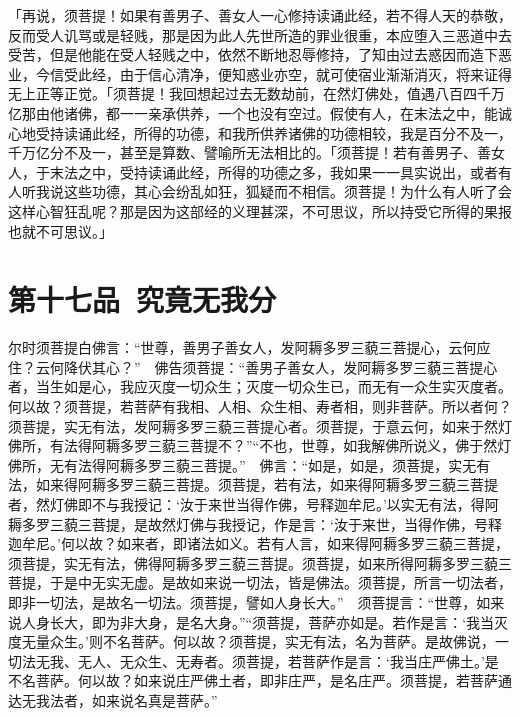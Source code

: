 \documentclass[12pt,twoside,openany]{book}
\newcommand{\kai}[1]{{\CJKfamily{kai}#1}}
\begin{document}
\kai{「再说，须菩提！如果有善男子、善女人一心修持读诵此经，若不得人天的恭敬，反而受人讥骂或是轻贱，那是因为此人先世所造的罪业很重，本应堕入三恶道中去受苦，但是他能在受人轻贱之中，依然不断地忍辱修持，了知由过去惑因而造下恶业，今信受此经，由于信心清净，便知惑业亦空，就可使宿业渐渐消灭，将来证得无上正等正觉。「须菩提！我回想起过去无数劫前，在然灯佛处，值遇八百四千万亿那由他诸佛，都一一亲承供养，一个也没有空过。假使有人，在末法之中，能诚心地受持读诵此经，所得的功德，和我所供养诸佛的功德相较，我是百分不及一，千万亿分不及一，甚至是算数、譬喻所无法相比的。「须菩提！若有善男子、善女人，于末法之中，受持读诵此经，所得的功德之多，我如果一一具实说出，或者有人听我说这些功德，其心会纷乱如狂，狐疑而不相信。须菩提！为什么有人听了会这样心智狂乱呢？那是因为这部经的义理甚深，不可思议，所以持受它所得的果报也就不可思议。」}


\chapter{第十七品\ 究竟无我分}
尔时须菩提白佛言：“世尊，善男子善女人，发阿耨多罗三藐三菩提心，云何应住？云何降伏其心？”　佛告须菩提：“善男子善女人，发阿耨多罗三藐三菩提心者，当生如是心，我应灭度一切众生；灭度一切众生已，而无有一众生实灭度者。何以故？须菩提，若菩萨有我相、人相、众生相、寿者相，则非菩萨。所以者何？须菩提，实无有法，发阿耨多罗三藐三菩提心者。须菩提，于意云何，如来于然灯佛所，有法得阿耨多罗三藐三菩提不？”“不也，世尊，如我解佛所说义，佛于然灯佛所，无有法得阿耨多罗三藐三菩提。”　佛言：“如是，如是，须菩提，实无有法，如来得阿耨多罗三藐三菩提。须菩提，若有法，如来得阿耨多罗三藐三菩提者，然灯佛即不与我授记：‘汝于来世当得作佛，号释迦牟尼。’以实无有法，得阿耨多罗三藐三菩提，是故然灯佛与我授记，作是言：‘汝于来世，当得作佛，号释迦牟尼。’何以故？如来者，即诸法如义。若有人言，如来得阿耨多罗三藐三菩提，须菩提，实无有法，佛得阿耨多罗三藐三菩提。须菩提，如来所得阿耨多罗三藐三菩提，于是中无实无虚。是故如来说一切法，皆是佛法。须菩提，所言一切法者，即非一切法，是故名一切法。须菩提，譬如人身长大。”　须菩提言：“世尊，如来说人身长大，即为非大身，是名大身。”“须菩提，菩萨亦如是。若作是言：‘我当灭度无量众生。’则不名菩萨。何以故？须菩提，实无有法，名为菩萨。是故佛说，一切法无我、无人、无众生、无寿者。须菩提，若菩萨作是言：‘我当庄严佛土。’是不名菩萨。何以故？如来说庄严佛土者，即非庄严，是名庄严。须菩提，若菩萨通达无我法者，如来说名真是菩萨。”
\end{document}
